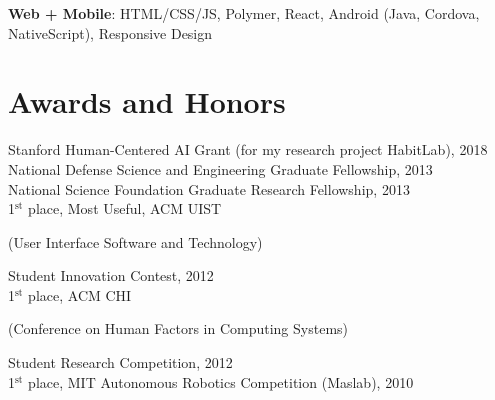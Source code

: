 \documentclass[margin,line]{resume}
\begin{document}
\begin{resume}
\vspace{-4mm}

\textbf{Web + Mobile}: HTML/CSS/JS, Polymer, React, Android (Java, Cordova, NativeScript), Responsive Design




\section{\mysidestyle Awards and Honors}

Stanford Human-Centered AI Grant (for my research project HabitLab), 2018\\ %
National Defense Science and Engineering Graduate Fellowship, 2013\\ %
National Science Foundation Graduate Research Fellowship, 2013\\ %
1$^{\textrm{st}}$ place, Most Useful, ACM UIST \begin{small}(User Interface Software and Technology)\end{small} Student Innovation Contest, 2012\\
1$^{\textrm{st}}$ place, ACM CHI \begin{small}(Conference on Human Factors in Computing Systems)\end{small} Student Research Competition, 2012\\
1$^{\textrm{st}}$ place, MIT Autonomous Robotics Competition (Maslab), 2010

\pagebreak



\end{resume}
\end{document}
